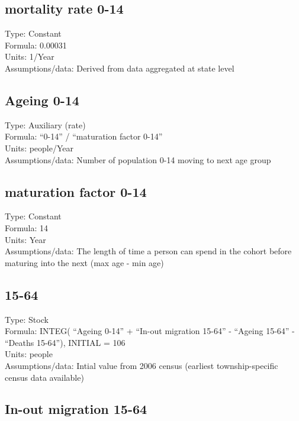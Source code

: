 \documentclass[
  11pt,
]{book}
\begin{document}
\hypertarget{mortality-rate-0-14}{%
\subsection{mortality rate 0-14}\label{mortality-rate-0-14}}

Type: Constant\\
Formula: 0.00031\\
Units: 1/Year\\
Assumptions/data: Derived from data aggregated at state level

\hypertarget{ageing-0-14}{%
\subsection{Ageing 0-14}\label{ageing-0-14}}

Type: Auxiliary (rate)\\
Formula: ``0-14'' / ``maturation factor 0-14''\\
Units: people/Year\\
Assumptions/data: Number of population 0-14 moving to next age group

\hypertarget{maturation-factor-0-14}{%
\subsection{maturation factor 0-14}\label{maturation-factor-0-14}}

Type: Constant\\
Formula: 14\\
Units: Year\\
Assumptions/data: The length of time a person can spend in the cohort before maturing into the next (max age - min age)

\hypertarget{section-1}{%
\subsection{15-64}\label{section-1}}

Type: Stock\\
Formula: INTEG( ``Ageing 0-14'' + ``In-out migration 15-64'' - ``Ageing 15-64'' - ``Deaths 15-64''), INITIAL = 106\\
Units: people\\
Assumptions/data: Intial value from 2006 census (earliest township-specific census data available)

\hypertarget{in-out-migration-15-64}{%
\subsection{In-out migration 15-64}\label{in-out-migration-15-64}}
\end{document}
